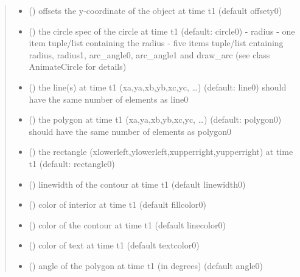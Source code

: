 \documentclass[letterpaper,10pt,english]{sphinxmanual}
\begin{document}
\begin{fulllineitems}
\begin{quote}
\begin{description}
\begin{itemize}
\item {} 
 () \textendash{} offsets the y-coordinate of the object at time t1 (default offsety0)

\item {} 
 () \textendash{} the circle spec of the circle at time t1 (default: circle0) 
- radius 
- one item tuple/list containing the radius 
- five items tuple/list cntaining radius, radius1, arc\_angle0, arc\_angle1 and draw\_arc
(see class AnimateCircle for details)

\item {} 
 () \textendash{} the line(s) at time t1 (xa,ya,xb,yb,xc,yc, …) (default: line0) 
should have the same number of elements as line0

\item {} 
 () \textendash{} the polygon at time t1 (xa,ya,xb,yb,xc,yc, …) (default: polygon0) 
should have the same number of elements as polygon0

\item {} 
 () \textendash{} the rectangle (xlowerleft,ylowerleft,xupperright,yupperright) at time t1
(default: rectangle0)

\item {} 
 () \textendash{} linewidth of the contour at time t1 (default linewidth0)

\item {} 
 () \textendash{} color of interior at time t1 (default fillcolor0)

\item {} 
 () \textendash{} color of the contour at time t1 (default linecolor0)

\item {} 
 () \textendash{} color of text at time t1 (default textcolor0)

\item {} 
 () \textendash{} angle of the polygon at time t1 (in degrees) (default angle0)


\end{itemize}
\end{description}
\end{quote}
\end{fulllineitems}
\end{document}
